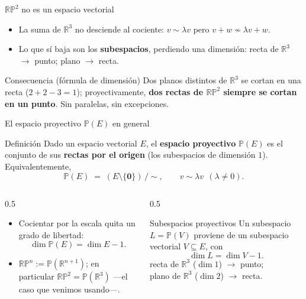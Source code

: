 \documentclass[aspectratio=169]{beamer}
\newcommand{\RP}{\mathbb{RP}}
\newcommand{\R}{\mathbb{R}}
\begin{document}
\begin{frame}{$\RP^2$ no es un espacio vectorial}
  \begin{itemize}
    \item La suma de $\R^3$ \alert{no desciende} al cociente: $v\sim\lambda v$
          pero $v+w\not\sim\lambda v+w$.
    \item Lo que sí baja son los \textbf{subespacios}, perdiendo una
          dimensión: recta de $\R^3$ $\to$ punto; plano $\to$ recta.
  \end{itemize}
  \vspace{0.2cm}
  \begin{block}{Consecuencia (fórmula de dimensión)}
    Dos planos distintos de $\R^3$ se cortan en una recta
    ($2+2-3=1$); proyectivamente, \textbf{dos rectas de $\RP^2$ siempre se
    cortan en un punto}. Sin paralelas, sin excepciones.
  \end{block}
\end{frame}

\begin{frame}{El espacio proyectivo $\mathbb P(E)$ en general}
  \begin{block}{Definición}
    Dado un espacio vectorial $E$, el \textbf{espacio proyectivo}
    $\mathbb P(E)$ es el conjunto de sus \textbf{rectas por el origen}
    (los subespacios de dimensión $1$). Equivalentemente,
    \[
      \mathbb P(E) \;=\; (E\setminus\{\mathbf 0\})\,/\!\sim,
      \qquad v \sim \lambda v \ \ (\lambda\neq 0).
    \]
  \end{block}
  \begin{columns}[T]
    \begin{column}{0.5\textwidth}
      \begin{itemize}
        \item Cocientar por la escala \alert{quita un grado de libertad}:
              \[ \dim \mathbb P(E) = \dim E - 1. \]
        \item $\RP^n := \mathbb P(\R^{n+1})$; \;
              en particular $\RP^2=\mathbb P(\R^3)$ —el caso que venimos
              usando—.
      \end{itemize}
    \end{column}
    \begin{column}{0.5\textwidth}
      \begin{block}{Subespacios proyectivos}
        Un subespacio $L=\mathbb P(V)$ proviene de un subespacio vectorial
        $V\subseteq E$, con
        \[ \dim L = \dim V - 1. \]
        {\footnotesize
        recta de $\R^3$ ($\dim 1$) $\to$ punto;\\
        plano de $\R^3$ ($\dim 2$) $\to$ recta.}
      \end{block}
    \end{column}
  \end{columns}
\end{frame}
\end{document}
